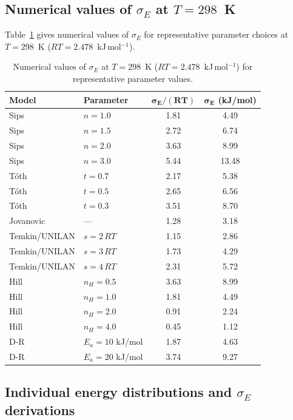 \documentclass[journal=aamick,manuscript=article]{achemso}
\begin{document}
\subsection{Numerical values of $\sigma_E$ at $T = 298$~K}
\label{sec:si_sigma_numerical}

Table~\ref{tab:si_sigma_numerical} gives numerical values of $\sigma_E$
for representative parameter choices at $T = 298$~K
($RT = 2.478$~kJ\,mol$^{-1}$).

\begin{table}[H]
	\centering
	\small
	\caption{Numerical values of $\sigma_E$ at $T = 298$~K
		($RT = 2.478$~kJ\,mol$^{-1}$) for representative parameter values.}
	\label{tab:si_sigma_numerical}
	\renewcommand{\arraystretch}{1.3}
	\begin{tabular}{@{} l l c c @{}}
		\toprule
		\textbf{Model} & \textbf{Parameter}
		& $\boldsymbol{\sigma_E/(RT)}$
		& $\boldsymbol{\sigma_E}$ (kJ/mol) \\
		\midrule
		Sips & $n = 1.0$ & 1.81 & 4.49 \\
		Sips & $n = 1.5$ & 2.72 & 6.74 \\
		Sips & $n = 2.0$ & 3.63 & 8.99 \\
		Sips & $n = 3.0$ & 5.44 & 13.48 \\
		\midrule
		T\'{o}th & $t = 0.7$ & 2.17 & 5.38 \\
		T\'{o}th & $t = 0.5$ & 2.65 & 6.56 \\
		T\'{o}th & $t = 0.3$ & 3.51 & 8.70 \\
		\midrule
		Jovanovic & --- & 1.28 & 3.18 \\
		\midrule
		Temkin/UNILAN & $s = 2\,RT$ & 1.15 & 2.86 \\
		Temkin/UNILAN & $s = 3\,RT$ & 1.73 & 4.29 \\
		Temkin/UNILAN & $s = 4\,RT$ & 2.31 & 5.72 \\
		\midrule
		Hill & $n_H = 0.5$ & 3.63 & 8.99 \\
		Hill & $n_H = 1.0$ & 1.81 & 4.49 \\
		Hill & $n_H = 2.0$ & 0.91 & 2.24 \\
		Hill & $n_H = 4.0$ & 0.45 & 1.12 \\
		\midrule
		D-R & $E_a = 10$ kJ/mol & 1.87 & 4.63 \\
		D-R & $E_a = 20$ kJ/mol & 3.74 & 9.27 \\
		\bottomrule
	\end{tabular}
\end{table}

\subsection{Individual energy distributions and $\sigma_E$ derivations}
\label{sec:si_individual_distributions}
\end{document}

